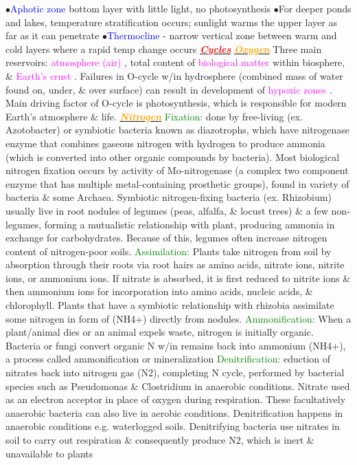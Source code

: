 \documentclass{article}
\newcommand{\ddd}{$\bullet$}
\newcommand{\red}[1]{\textcolor{red}{#1}}
\newcommand{\green}[1]{\textcolor{green}{#1}}
\newcommand{\blue}[1]{\textcolor{blue}{#1}}
\newcommand{\pink}[1]{\textcolor{magenta}{#1}}
\newcommand{\orange}[1]{\textcolor{orange}{#1}}
\newcommand{\mysection}[1]{\underline{{\textbf{\textit{\red{#1}}}}}}
\newcommand{\mysubsection}[1]{\underline{\textbf{{\textit{\orange{#1}}}}}}
\newcommand{\mysubsub}[1]{{{\green{#1}}}}
\begin{document}
\begin{multicols*}{4}
            \ddd \blue{Aphotic zone} bottom layer with little light, no photosynthesis
            \ddd For deeper ponds and lakes, temperature stratification occurs; sunlight warms the upper layer as far as it can penetrate
            \ddd \blue{Thermocline} - narrow vertical zone between warm and cold layers where a rapid temp change occurs 
	\mysection{Cycles}
		\mysubsection{Oxygen}
		Three main reservoirs: \pink{ atmosphere (air) }, total content of \pink{ biological matter } within biosphere, \& \pink{ Earth's crust }. Failures in O-cycle w/in hydrosphere (combined mass of water found on, under, \& over surface) can result in development of \pink{ hypoxic zones }. Main driving factor of O-cycle is photosynthesis, which is responsible for modern Earth's atmosphere \& life. 
		\mysubsection{Nitrogen}
			\mysubsub{Fixation: } 
				done by free-living (ex. Azotobacter) or symbiotic bacteria known as diazotrophs, which have nitrogenase enzyme that combines gaseous nitrogen with hydrogen to produce ammonia (which is converted into other organic compounds by bacteria). Most biological nitrogen fixation occurs by activity of Mo-nitrogenase (a complex two component enzyme that has multiple metal-containing prosthetic groups), found in variety of bacteria \& some Archaea. Symbiotic nitrogen-fixing bacteria (ex. Rhizobium) usually live in root nodules of legumes (peas, alfalfa, \& locust trees) \& a few non-legumes, forming a mutualistic relationship with plant, producing ammonia in exchange for carbohydrates. Because of this, legumes often increase nitrogen content of nitrogen-poor soils.
			\mysubsub{Assimilation: }
				Plants take nitrogen from soil by absorption through their roots via root hairs as amino acids, nitrate ions, nitrite ions, or ammonium ions. If nitrate is absorbed, it is first reduced to nitrite ions \& then ammonium ions for incorporation into amino acids, nucleic acids, \& chlorophyll. Plants that have a symbiotic relationship with rhizobia assimilate some nitrogen in form of (NH4+) directly from nodules.
			\mysubsub{Ammonification: }
				When a plant/animal dies or an animal expels waste, nitrogen is initially organic. Bacteria or fungi convert organic N w/in remains back into ammonium (NH4+), a process called ammonification or mineralization
			\mysubsub{Denitrification: }
				eduction of nitrates back into nitrogen gas (N2), completing N cycle, performed by bacterial species such as Pseudomonas \& Clostridium in anaerobic conditions. Nitrate used as an electron acceptor in place of oxygen during respiration. These facultatively anaerobic bacteria can also live in aerobic conditions. Denitrification happens in anaerobic conditions e.g. waterlogged soils. Denitrifying bacteria use nitrates in soil to carry out respiration \& consequently produce N2, which is inert \& unavailable to plants 

\end{multicols*}
\end{document}

